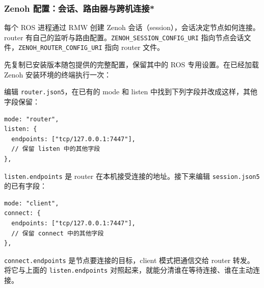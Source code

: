 \subsubsection{Zenoh 配置：会话、路由器与跨机连接*}
每个 ROS 进程通过 RMW 创建 Zenoh 会话（session），会话决定节点如何连接。router 有自己的监听与路由配置。\texttt{ZENOH\_SESSION\_CONFIG\_URI} 指向节点会话文件，\texttt{ZENOH\_ROUTER\_CONFIG\_URI} 指向 router 文件。

\begin{example}
先复制已安装版本随包提供的完整配置，保留其中的 ROS 专用设置。在已经加载 Zenoh 安装环境的终端执行一次：
\par\medskip\noindent\begin{minipage}{\linewidth}
\end{minipage}\par\smallskip
{}
编辑 \texttt{router.json5}，在已有的 mode 和 listen 中找到下列字段并改成这样，其他字段保留：
\par\medskip\noindent\begin{minipage}{\linewidth}
\begin{lstlisting}[language={},frame=single]
mode: "router",
listen: {
  endpoints: ["tcp/127.0.0.1:7447"],
  // 保留 listen 中的其他字段
},
\end{lstlisting}
\end{minipage}\par\smallskip
\texttt{listen.endpoints} 是 router 在本机接受连接的地址。接下来编辑 \texttt{session.json5} 的已有字段：
\par\medskip\noindent\begin{minipage}{\linewidth}
\begin{lstlisting}[language={},frame=single]
mode: "client",
connect: {
  endpoints: ["tcp/127.0.0.1:7447"],
  // 保留 connect 中的其他字段
},
\end{lstlisting}
\end{minipage}\par\smallskip
\texttt{connect.endpoints} 是节点要连接的目标，client 模式把通信交给 router 转发。将它与上面的 \texttt{listen.endpoints} 对照起来，就能分清谁在等待连接、谁在主动连接。


\end{example}
